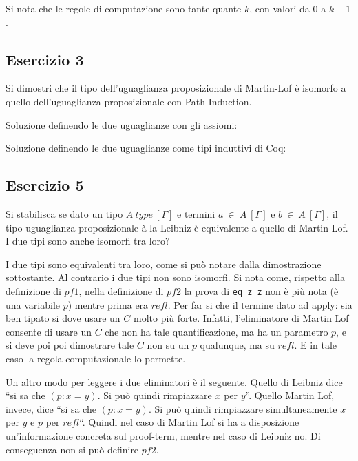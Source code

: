 Si nota che le regole di computazione sono tante quante $k$, con valori da $0$ a $k-1$.

\subsection{Esercizio 3}
\begin{thm}
	Si dimostri che il tipo dell'uguaglianza proposizionale di Martin-Lof è isomorfo a quello dell'uguaglianza proposizionale con Path Induction.
\end{thm}
Soluzione definendo le due uguaglianze con gli assiomi:


Soluzione definendo le due uguaglianze come tipi induttivi di Coq:


\subsection{Esercizio 5}
\begin{thm}
	Si stabilisca se dato un tipo $A~type~[\Gamma]$ e termini $a~\in~A~[\Gamma]$ e $b~\in~A~[\Gamma]$, il tipo uguaglianza proposizionale à la Leibniz è equivalente a quello di Martin-Lof. I due tipi sono anche isomorfi tra loro?
\end{thm}
I due tipi sono equivalenti tra loro, come si può notare dalla dimostrazione sottostante. Al contrario i due tipi non sono isomorfi. Si nota come, rispetto alla definizione di $pf1$, nella definizione di $pf2$ la prova di \texttt{eq z z} non è più nota (è una variabile $p$) mentre prima era $refl$. Per far si che il termine dato ad apply: sia ben tipato si dove usare un $C$ molto più forte. Infatti, l'eliminatore di Martin Lof consente di usare un $C$ che non ha tale quantificazione, ma ha un parametro $p$, e si deve poi poi dimostrare tale $C$ non su un $p$ qualunque, ma su $refl$.  E in tale caso la regola computazionale lo permette.

Un altro modo per leggere i due eliminatori è il seguente. Quello di Leibniz dice ``si sa che $(p : x = y)$. Si può quindi rimpiazzare $x$ per $y$''. Quello Martin Lof, invece, dice ``si sa che $(p : x = y)$. Si può quindi rimpiazzare simultaneamente $x$ per $y$ e $p$ per $refl$``. Quindi nel caso di Martin Lof si ha a disposizione un'informazione concreta sul proof-term, mentre nel caso di Leibniz no. Di conseguenza non si può definire $pf2$.

